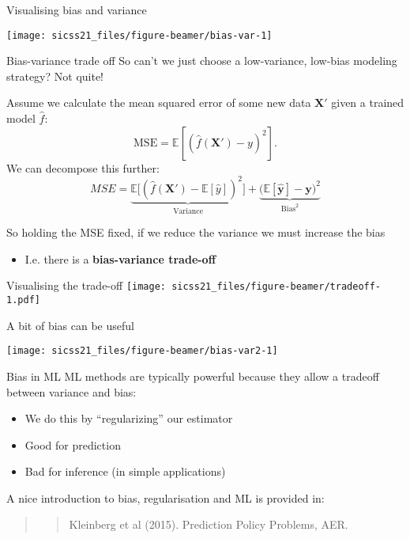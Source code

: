 \documentclass[
  ignorenonframetext,
]{beamer}
\providecommand{\tightlist}{%
  \setlength{\itemsep}{0pt}\setlength{\parskip}{0pt}}
\begin{document}
\begin{frame}{Visualising bias and variance}
\protect\hypertarget{visualising-bias-and-variance}{}
\begin{center}\texttt{[image: sicss21\_files/figure-beamer/bias-var-1]} \end{center}
\end{frame}

\begin{frame}{Bias-variance trade off}
\protect\hypertarget{bias-variance-trade-off}{}
So can't we just choose a low-variance, low-bias modeling strategy? Not
quite!

Assume we calculate the mean squared error of some new data \(\bm{X'}\)
given a trained model \(\hat{f}\): \[
\text{MSE} = \mathbb{E}[(\hat{f}(\bm{X'})  - y)^2].
\] We can decompose this further: \[
MSE = \underbrace{\mathbb{E}\big[(\hat{f}(\bm{X'})-\mathbb{E}[\hat{y}])^2\big]}_{\text{Variance}} + \underbrace{\big(\mathbb{E}[\bm{\hat{y}}] - \bm{y}\big)^2}_{\text{Bias}^2}
\]

So holding the MSE fixed, if we reduce the variance we must increase the
bias

\begin{itemize}
\tightlist
\item
  I.e. there is a \textbf{bias-variance trade-off}
\end{itemize}
\end{frame}

\begin{frame}{Visualising the trade-off}
\protect\hypertarget{visualising-the-trade-off}{}
\texttt{[image: sicss21\_files/figure-beamer/tradeoff-1.pdf]}
\end{frame}

\begin{frame}{A bit of bias can be useful}
\protect\hypertarget{a-bit-of-bias-can-be-useful}{}
\begin{center}\texttt{[image: sicss21\_files/figure-beamer/bias-var2-1]} \end{center}
\end{frame}

\begin{frame}{Bias in ML}
\protect\hypertarget{bias-in-ml}{}
ML methods are typically powerful because they allow a tradeoff between
variance and bias:

\begin{itemize}
\item
  We do this by ``regularizing'' our estimator
\item
  Good for prediction
\item
  Bad for inference (in simple applications)
\end{itemize}

A nice introduction to bias, regularisation and ML is provided in:

\begin{quote}
\begin{quote}
Kleinberg et al (2015). Prediction Policy Problems, AER.
\end{quote}
\end{quote}
\end{frame}
\end{document}

